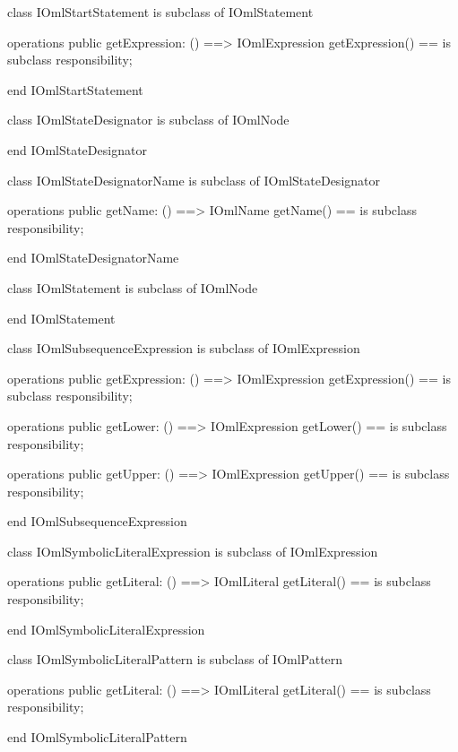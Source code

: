\begin{vdm_al}
class IOmlStartStatement
 is subclass of IOmlStatement

operations
  public getExpression: () ==> IOmlExpression
  getExpression() == is subclass responsibility;

end IOmlStartStatement
\end{vdm_al}

\begin{vdm_al}
class IOmlStateDesignator
 is subclass of IOmlNode

end IOmlStateDesignator
\end{vdm_al}

\begin{vdm_al}
class IOmlStateDesignatorName
 is subclass of IOmlStateDesignator

operations
  public getName: () ==> IOmlName
  getName() == is subclass responsibility;

end IOmlStateDesignatorName
\end{vdm_al}

\begin{vdm_al}
class IOmlStatement
 is subclass of IOmlNode

end IOmlStatement
\end{vdm_al}

\begin{vdm_al}
class IOmlSubsequenceExpression
 is subclass of IOmlExpression

operations
  public getExpression: () ==> IOmlExpression
  getExpression() == is subclass responsibility;

operations
  public getLower: () ==> IOmlExpression
  getLower() == is subclass responsibility;

operations
  public getUpper: () ==> IOmlExpression
  getUpper() == is subclass responsibility;

end IOmlSubsequenceExpression
\end{vdm_al}

\begin{vdm_al}
class IOmlSymbolicLiteralExpression
 is subclass of IOmlExpression

operations
  public getLiteral: () ==> IOmlLiteral
  getLiteral() == is subclass responsibility;

end IOmlSymbolicLiteralExpression
\end{vdm_al}

\begin{vdm_al}
class IOmlSymbolicLiteralPattern
 is subclass of IOmlPattern

operations
  public getLiteral: () ==> IOmlLiteral
  getLiteral() == is subclass responsibility;

end IOmlSymbolicLiteralPattern
\end{vdm_al}

